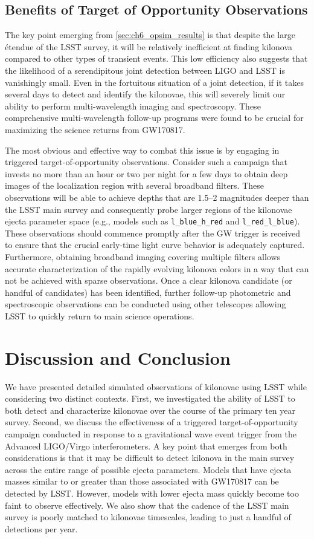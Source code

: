 \clearpage
\subsection{Benefits of Target of Opportunity Observations}
\label{sec:ch6_too_benefits}
The key point emerging from \cref{sec:ch6_opsim_results} is that despite the large \'{e}tendue of the LSST survey, it will be relatively inefficient at finding kilonova compared to other types of transient events. This low efficiency also suggests that the likelihood of a serendipitous joint detection between LIGO and LSST is vanishingly small. Even in the fortuitous situation of a joint detection, if it takes several days to detect and identify the kilonovae, this will severely limit our ability to perform multi-wavelength imaging and spectroscopy. These comprehensive multi-wavelength follow-up programs were found to be crucial for maximizing the science returns from GW170817.

The most obvious and effective way to combat this issue is by engaging in triggered target-of-opportunity observations. Consider such a campaign that invests no more than an hour or two per night for a few days to obtain deep images of the localization region with several broadband filters. These observations will be able to achieve depths that are 1.5--2 magnitudes deeper than the LSST main survey and consequently probe larger regions of the kilonovae ejecta parameter space (e.g., models such as {\tt l\_blue\_h\_red} and {\tt l\_red\_l\_blue}). These observations should commence promptly after the GW trigger is received to ensure that the crucial early-time light curve behavior is adequately captured. Furthermore, obtaining broadband imaging covering multiple filters allows accurate characterization of the rapidly evolving kilonova colors in a way that can not be achieved with sparse observations. Once a clear kilonova candidate (or handful of candidates) has been identified, further follow-up photometric and spectroscopic observations can be conducted using other telescopes allowing LSST to quickly return to main science operations.

\section{Discussion and Conclusion}
\label{sec:ch6_conc}
We have presented detailed simulated observations of kilonovae using LSST while considering two distinct contexts. First, we investigated the ability of LSST to both detect and characterize kilonovae over the course of the primary ten year survey. Second, we discuss the effectiveness of a triggered target-of-opportunity campaign conducted in response to a gravitational wave event trigger from the Advanced LIGO/Virgo interferometers. A key point that emerges from both considerations is that it may be difficult to detect kilonova in the main survey across the entire range of possible ejecta parameters. Models that have ejecta masses similar to or greater than those associated with GW170817 can be detected by LSST. However, models with lower ejecta mass quickly become too faint to observe effectively. We also show that the cadence of the LSST main survey is poorly matched to kilonovae timescales, leading to just a handful of detections per year. 

